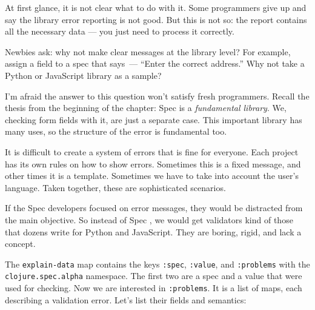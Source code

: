 
At first glance, it is not clear what to do with it. Some programmers give up and say the library error reporting is not good. But this is not so: the report contains all the necessary data — you just need to process it correctly. 

Newbies ask: why not make clear messages at the library level? For example, assign a field to a spec that says~--- “Enter the correct address.” Why not take a Python or JavaScript library as a sample?


I'm afraid the answer to this question won't satisfy fresh programmers. Recall the thesis from the beginning of the chapter: Spec is a \emph{fundamental library}. We, checking form fields with it, are just a separate case. This important library has many uses, so the structure of the error is fundamental too.

It is difficult to create a system of errors that is fine for everyone. Each project has its own rules on how to show errors. Sometimes this is a fixed message, and other times it is a template. Sometimes we have to take into account the user's language. Taken together, these are sophisticated scenarios.

If the Spec developers focused on error messages, they would be distracted from the main objective. So instead of Spec , we would get validators kind of those that dozens write for Python and JavaScript. They are boring, rigid, and lack a concept.

The \verb|explain-data| map contains the keys \verb|:spec|, \verb|:value|, and \verb|:problems| with the \verb|clojure.spec.alpha| namespace. The first two are a spec and a value that were used for checking. Now we are interested in \verb|:problems|. It is a list of maps, each describing a validation error. Let's list their fields and semantics: 



